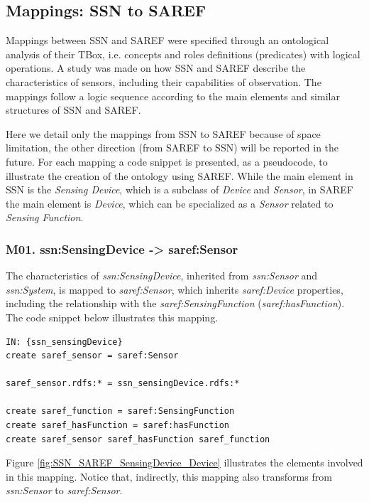 \documentclass{sig-alternate-05-2015}
\begin{document}
\subsection{Mappings: SSN to SAREF}
Mappings between SSN and SAREF were specified through an ontological analysis of their TBox, i.e. concepts and roles definitions (predicates) with logical operations. A study was made on how SSN and SAREF describe the characteristics of sensors, including their capabilities of observation. The mappings follow a logic sequence according to the main elements and similar structures of SSN and SAREF. 

Here we detail only the mappings from SSN to SAREF because of space limitation, the other direction (from SAREF to SSN) will be reported in the future. For each mapping a code snippet is presented, as a pseudocode, to illustrate the creation of the ontology using SAREF. While the main element in SSN is the \textit{Sensing Device}, which is a subclass of \textit{Device} and \textit{Sensor}, in SAREF the main element is \textit{Device}, which can be specialized as a \textit{Sensor} related to \textit{Sensing Function}. 

\subsubsection{M01. ssn:\-SensingDevice -> saref:\-Sensor}
The characteristics of \textit{ssn:\-SensingDevice}, inherited from \textit{ssn:\-Sensor} and \textit{ssn:\-System}, is mapped to \textit{saref:\-Sensor}, which inherits \textit{saref:\-Device} properties, including the relationship with the \textit{saref:\-SensingFunction} (\textit{saref:\-hasFunction}). The code snippet below illustrates this mapping. 

\begin{lstlisting}[caption={Pseudocode snippet for M01},label={code:sample}]
IN: {ssn_sensingDevice}  
create saref_sensor = saref:Sensor  

saref_sensor.rdfs:* = ssn_sensingDevice.rdfs:*
    
create saref_function = saref:SensingFunction  
create saref_hasFunction = saref:hasFunction  
create saref_sensor saref_hasFunction saref_function  

\end{lstlisting}

Figure \ref{fig:SSN_SAREF_SensingDevice_Device} illustrates the elements involved in this mapping. Notice that, indirectly, this mapping also transforms from \textit{ssn:\-Sensor} to \textit{saref:\-Sensor}.
\end{document}
